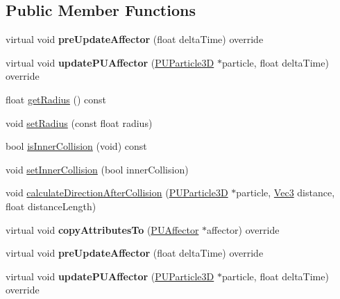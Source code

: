 \subsection*{Public Member Functions}
\begin{DoxyCompactItemize}
\item 
\mbox{\label{classPUSphereCollider_a21bdf0872a0240a433d40a789c6a9761}} 
virtual void {\bfseries pre\+Update\+Affector} (float delta\+Time) override
\item 
\mbox{\label{classPUSphereCollider_a0c508a2ffd04ceb866801a7693d2157a}} 
virtual void {\bfseries update\+P\+U\+Affector} (\hyperlink{structPUParticle3D}{P\+U\+Particle3D} $\ast$particle, float delta\+Time) override
\item 
float \hyperlink{classPUSphereCollider_af2a9f80cc6cf89766a41d7244f9fe3e2}{get\+Radius} () const
\item 
void \hyperlink{classPUSphereCollider_ab3063655165ec183d0e0c8d49a61e29c}{set\+Radius} (const float radius)
\item 
bool \hyperlink{classPUSphereCollider_ae9d8719922d5c5650acca47ca71ac203}{is\+Inner\+Collision} (void) const
\item 
void \hyperlink{classPUSphereCollider_afd5152513a9f7e83e4da0fb6f817daf3}{set\+Inner\+Collision} (bool inner\+Collision)
\item 
void \hyperlink{classPUSphereCollider_af21786180605ce1e8ef8044caf352c35}{calculate\+Direction\+After\+Collision} (\hyperlink{structPUParticle3D}{P\+U\+Particle3D} $\ast$particle, \hyperlink{classVec3}{Vec3} distance, float distance\+Length)
\item 
\mbox{\label{classPUSphereCollider_aaad4218b7fe588aa5f684fd6f1ffe5af}} 
virtual void {\bfseries copy\+Attributes\+To} (\hyperlink{classPUAffector}{P\+U\+Affector} $\ast$affector) override
\item 
\mbox{\label{classPUSphereCollider_a16a6e4723aef17a2ef7aac37d2ebc68a}} 
virtual void {\bfseries pre\+Update\+Affector} (float delta\+Time) override
\item 
\mbox{\label{classPUSphereCollider_a67da596e30637601b8261a89776a16c8}} 
virtual void {\bfseries update\+P\+U\+Affector} (\hyperlink{structPUParticle3D}{P\+U\+Particle3D} $\ast$particle, float delta\+Time) override

\end{DoxyCompactItemize}

